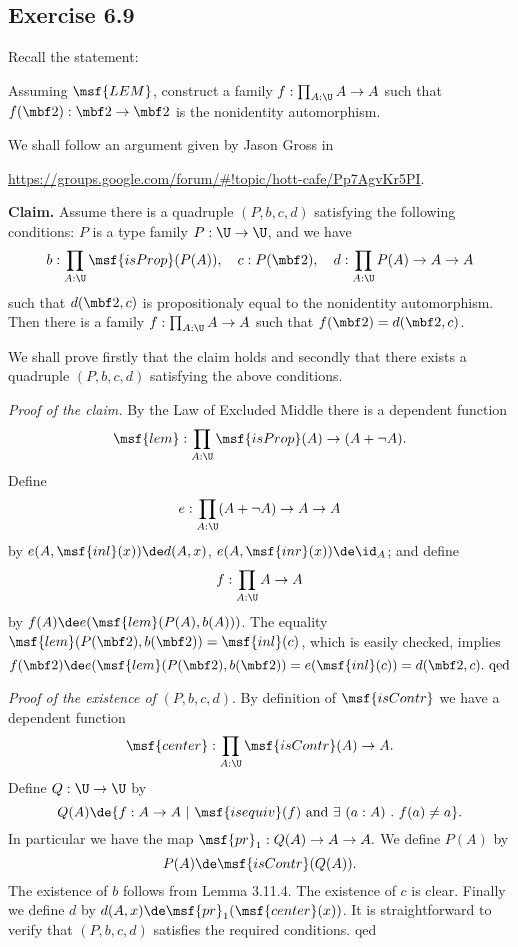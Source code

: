 \documentclass[12pt]{article}
\begin{document}
\subsection{Exercise 6.9}

Recall the statement:

Assuming $\msf{LEM}$, construct a family $f:\prod_{A:\U}A\to A$ such that $f(\mbf2):\mbf2\to\mbf2$ is the nonidentity automorphism.


We shall follow an argument given by Jason Gross in 

\nn\href{https://groups.google.com/forum/#!topic/hott-cafe/Pp7AgvKr5PI}{https://groups.google.com/forum/\#!topic/hott-cafe/Pp7AgvKr5PI}.


\nn\textbf{Claim.} Assume there is a quadruple $(P,b,c,d)$ satisfying the following conditions: $P$ is a type family $P:\U\to\U$, and we have
$$
b:\prod_{A:\U}\msf{isProp}(P(A)),\quad c:P(\mbf2),\quad d:\prod_{A:\U}P(A)\to A\to A
$$ 
such that $d(\mbf2,c)$ is propositionaly equal to the nonidentity automorphism. Then there is a family $f:\prod_{A:\U}A\to A$ such that $f(\mbf2)=d(\mbf2,c)$. %

We shall prove firstly that the claim holds and secondly that there exists a quadruple $(P,b,c,d)$ satisfying the above conditions.

\nn\emph{Proof of the claim.} By the Law of Excluded Middle there is a dependent function 
$$
\msf{lem}:\prod_{A:\U}\msf{isProp}(A)\to(A+\neg A).
$$ 
Define 
$$
e:\prod_{A:\U}(A+\neg A)\to A\to A
$$ 
by $e(A,\msf{inl}(x))\de d(A,x)$, $e(A,\msf{inr}(x))\de\id_A$; and define 
$$
f:\prod_{A:\U}A\to A
$$ 
by $f(A)\de e(\msf{lem}(P(A),b(A)))$. The equality $\msf{lem}(P(\mbf2),b(\mbf2))=\msf{inl}(c)$, which is easily checked, implies  
$$
f(\mbf2)\de e(\msf{lem}(P(\mbf2),b(\mbf2))=e(\msf{inl}(c))=d(\mbf2,c).\text{ qed} 
$$ 

\nn\emph{Proof of the existence of} $(P,b,c,d)$. By definition of $\msf{isContr}$ we have a dependent function 
$$
\msf{center}:\prod_{A:\U}\msf{isContr}(A)\to A.
$$ 
Define $Q:\U\to\U$ by 
$$
Q(A)\de\{f:A\to A\ |\ \msf{isequiv}(f)\text{ and }\exists\ (a:A)\ .\ f(a)\neq a\}.
$$ 
In particular we have the map 
$
\msf{pr}_1:Q(A)\to A\to A.
$ 
We define $P(A)$ by 
$$
P(A)\de\msf{isContr}(Q(A)).
$$ 
The existence of $b$ follows from Lemma 3.11.4. The existence of $c$ is clear. Finally we define $d$ by $d(A,x)\de\msf{pr}_1(\msf{center}(x))$. It is straightforward to verify that $(P,b,c,d)$ satisfies the required conditions. qed
\end{document}
